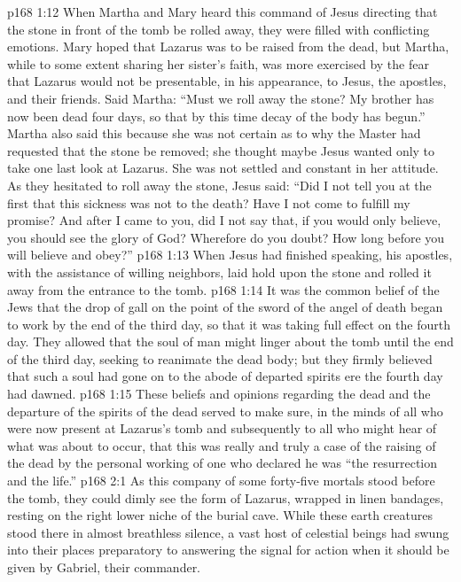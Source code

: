 \vs p168 1:12 When Martha and Mary heard this command of Jesus directing that the stone in front of the tomb be rolled away, they were filled with conflicting emotions. Mary hoped that Lazarus was to be raised from the dead, but Martha, while to some extent sharing her sister’s faith, was more exercised by the fear that Lazarus would not be presentable, in his appearance, to Jesus, the apostles, and their friends. Said Martha: “Must we roll away the stone? My brother has now been dead four days, so that by this time decay of the body has begun.” Martha also said this because she was not certain as to why the Master had requested that the stone be removed; she thought maybe Jesus wanted only to take one last look at Lazarus. She was not settled and constant in her attitude. As they hesitated to roll away the stone, Jesus said: \textcolor{ubdarkred}{“Did I not tell you at the first that this sickness was not to the death? Have I not come to fulfill my promise? And after I came to you, did I not say that, if you would only believe, you should see the glory of God? Wherefore do you doubt? How long before you will believe and obey?”}\plusone
\vs p168 1:13 When Jesus had finished speaking, his apostles, with the assistance of willing neighbors, laid hold upon the stone and rolled it away from the entrance to the tomb.
\pc \vs p168 1:14 It was the common belief of the Jews that the drop of gall on the point of the sword of the angel of death began to work by the end of the third day, so that it was taking full effect on the fourth day. They allowed that the soul of man might linger about the tomb until the end of the third day, seeking to reanimate the dead body; but they firmly believed that such a soul had gone on to the abode of departed spirits ere the fourth day had dawned.
\vs p168 1:15 These beliefs and opinions regarding the dead and the departure of the spirits of the dead served to make sure, in the minds of all who were now present at Lazarus’s tomb and subsequently to all who might hear of what was about to occur, that this was really and truly a case of the raising of the dead by the personal working of one who declared he was \textcolor{ubdarkred}{“the resurrection and the life.”}
\vs p168 2:1 As this company of some forty\hyp{}five mortals stood before the tomb, they could dimly see the form of Lazarus, wrapped in linen bandages, resting on the right lower niche of the burial cave. While these earth creatures stood there in almost breathless silence, a vast host of celestial beings had swung into their places preparatory to answering the signal for action when it should be given by Gabriel, their commander.
